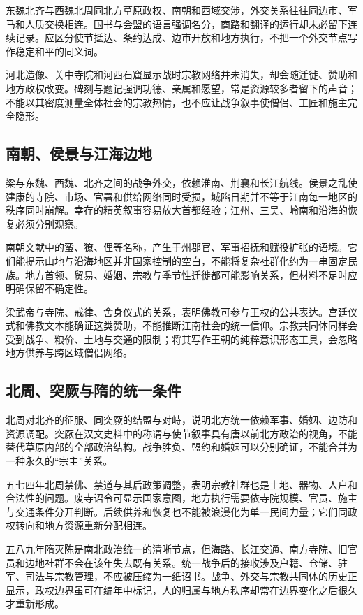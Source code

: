 东魏北齐与西魏北周同北方草原政权、南朝和西域交涉，外交关系往往同边市、军马和人质交换相连。国书与会盟的语言强调名分，商路和翻译的运行却未必留下连续记录。应区分使节抵达、条约达成、边市开放和地方执行，不把一个外交节点写作稳定和平的同义词。

河北造像、关中寺院和河西石窟显示战时宗教网络并未消失，却会随迁徙、赞助和地方政权改变。碑刻与题记强调功德、亲属和愿望，常是资源较多者留下的声音；不能以其密度测量全体社会的宗教热情，也不应让战争叙事使僧侣、工匠和施主完全隐形。

\subsection{南朝、侯景与江海边地}

梁与东魏、西魏、北齐之间的战争外交，依赖淮南、荆襄和长江航线。侯景之乱使建康的寺院、市场、官署和供给网络同时受损，城陷日期并不等于江南每一地区的秩序同时崩解。幸存的精英叙事容易放大首都经验；江州、三吴、岭南和沿海的恢复必须分别观察。

南朝文献中的蛮、獠、俚等名称，产生于州郡官、军事招抚和赋役扩张的语境。它们能提示山地与沿海地区并非国家控制的空白，不能将复杂社群化约为一串固定民族。地方首领、贸易、婚姻、宗教与季节性迁徙都可能影响关系，但材料不足时应明确保留不确定性。

梁武帝与寺院、戒律、舍身仪式的关系，表明佛教可参与王权的公共表达。宫廷仪式和佛教文本能确证这类赞助，不能推断江南社会的统一信仰。宗教共同体同样会受到战争、粮价、土地与交通的限制；将其写作王朝的纯粹意识形态工具，会忽略地方供养与跨区域僧侣网络。

\subsection{北周、突厥与隋的统一条件}

北周对北齐的征服、同突厥的结盟与对峙，说明北方统一依赖军事、婚姻、边防和资源调配。突厥在汉文史料中的称谓与使节叙事具有唐以前北方政治的视角，不能替代草原内部的全部政治结构。战争胜负、盟约和婚姻可以分别确证，不能合并为一种永久的“宗主”关系。

五七四年北周禁佛、禁道与其后政策调整，表明宗教社群也是土地、器物、人户和合法性的问题。废寺诏令可显示国家意图，地方执行需要依寺院规模、官员、施主与交通条件分开判断。后续供养和恢复也不能被浪漫化为单一民间力量；它们同政权转向和地方资源重新分配相连。

五八九年隋灭陈是南北政治统一的清晰节点，但海路、长江交通、南方寺院、旧官员和边地社群不会在该年失去既有关系。统一战争后的接收涉及户籍、仓储、驻军、司法与宗教管理，不应被压缩为一纸诏书。战争、外交与宗教共同体的历史正显示，政权边界虽可在编年中标记，人的归属与地方秩序却常在边界变化之后很久才重新形成。
